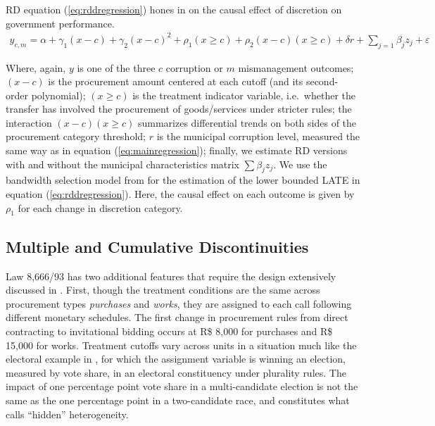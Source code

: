 \documentclass[11pt]{article}
\begin{document}
RD equation (\ref{eq:rddregression}) hones in on the causal effect of discretion on government performance.
\begin{equation} \label{eq:rddregression}
  \begin{aligned}
    y_{c,m} = \alpha + \gamma_{1}(x-c) + \gamma_{2}(x-c)^{2}+ \rho_{1}(x \geq c) + \rho_{2} (x-c) (x \geq c) + \delta r + \sum_{j = 1} \beta_{j} z_{j} + \varepsilon
  \end{aligned}
\end{equation}

Where, again, $y$ is one of the three $c$ corruption or $m$ mismanagement outcomes; $(x - c)$ is the procurement amount centered at each cutoff (and its second-order polynomial); $(x \geq c)$ is the treatment indicator variable, i.e.~whether the transfer has involved the procurement of goods/services under stricter rules; the interaction $(x - c)(x \geq c)$ summarizes differential trends on both sides of the procurement category threshold; $r$ is the municipal corruption level, measured the same way as in equation (\ref{eq:mainregression}); finally, we estimate RD versions with and without the municipal characteristics matrix $\sum \beta_{j} z_{j}$. We use the bandwidth selection model from \citet{CalonicoOptimalDataDrivenRegression2015} for the estimation of the lower bounded LATE in equation (\ref{eq:rddregression}). Here, the causal effect on each outcome is given by $\rho_{1}$ for each change in discretion category.

\subsection{Multiple and Cumulative Discontinuities} \label{subsec:multiplecutoff}

Law 8,666/93 has two additional features that require the design extensively discussed in \citet{CattaneoInterpretingRegressionDiscontinuity2016}. First, though the treatment conditions are the same across procurement types \emph{purchases} and \emph{works}, they are assigned to each call following different monetary schedules. The first change in procurement rules from direct contracting to invitational bidding occurs at R\$ 8,000 for purchases and R\$ 15,000 for works. Treatment cutoffs vary across units in a situation much like the electoral example in \citet{CattaneoInterpretingRegressionDiscontinuity2016}, for which the assignment variable is winning an election, measured by vote share, in an electoral constituency under plurality rules. The impact of one percentage point vote share in a multi-candidate election is not the same as the one percentage point in a two-candidate race, and constitutes what \citet{CattaneoInterpretingRegressionDiscontinuity2016} calls ``hidden'' heterogeneity.
\end{document}
